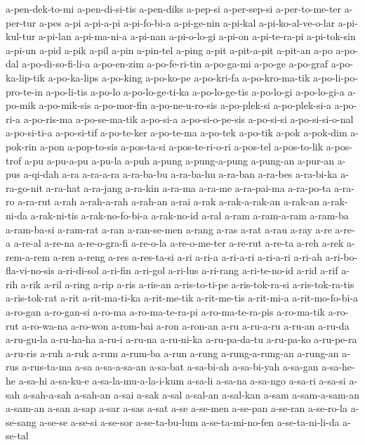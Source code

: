 {a-pen-dek-to-mi a-pen-di-si-tis a-pen-diks a-pep-si a-per-sep-si
a-per-to-me-ter a-per-tur a-pes a-pi a-pi-a-pi a-pi-fo-bi-a a-pi-ge-nin
a-pi-kal a-pi-ko-al-ve-o-lar a-pi-kul-tur a-pi-lan a-pi-ma-ni-a a-pi-nan
a-pi-o-lo-gi a-pi-on a-pi-te-ra-pi a-pi-tok-sin a-pi-un a-pid a-pik a-pil
a-pin a-pin-tel a-ping a-pit a-pit-a-pit a-pit-an a-po a-po-dal
a-po-di-so-fi-li-a a-po-en-zim a-po-fe-ri-tin a-po-ga-mi a-po-ge a-po-graf
a-po-ka-lip-tik a-po-ka-lips a-po-king a-po-ko-pe a-po-kri-fa
a-po-kro-ma-tik a-po-li-po-pro-te-in a-po-li-tis a-po-lo a-po-lo-ge-ti-ka
a-po-lo-ge-tis a-po-lo-gi a-po-lo-gi-a a-po-mik a-po-mik-sis a-po-mor-fin
a-po-ne-u-ro-sis a-po-plek-si a-po-plek-si-a a-po-ri-a a-po-ris-ma
a-po-se-ma-tik a-po-si-a a-po-si-o-pe-sis a-po-si-si a-po-si-si-o-nal
a-po-si-ti-a a-po-si-tif a-po-te-ker a-po-te-ma a-po-tek a-po-tik a-pok
a-pok-dim a-pok-rin a-pon a-pop-to-sis a-pos-ta-si a-pos-te-ri-o-ri
a-pos-tel a-pos-to-lik a-pos-trof a-pu a-pu-a-pu a-pu-la a-puh a-pung
a-pung-a-pung a-pung-an a-pur-an a-pus a-qi-dah a-ra a-ra-a-ra a-ra-ba-bu
a-ra-ba-hu a-ra-ban a-ra-bes a-ra-bi-ka a-ra-go-nit a-ra-hat a-ra-jang
a-ra-kin a-ra-ma a-ra-me a-ra-pai-ma a-ra-po-ta a-ra-ro a-ra-rut a-rah
a-rah-a-rah a-rah-an a-rai a-rak a-rak-a-rak-an a-rak-an a-rak-ni-da
a-rak-ni-tis a-rak-no-fo-bi-a a-rak-no-id a-ral a-ram a-ram-a-ram a-ram-ba
a-ram-ba-si a-ram-rat a-ran a-ran-se-men a-rang a-ras a-rat a-rau a-ray
a-re a-re-a a-re-al a-re-na a-re-o-gra-fi a-re-o-la a-re-o-me-ter a-re-rut
a-re-ta a-reh a-rek a-rem-a-rem a-ren a-reng a-res a-res-ta-si a-ri a-ri-a
a-ri-a-ri a-ri-a-ri a-ri-ah a-ri-bo-fla-vi-no-sis a-ri-di-sol a-ri-fin
a-ri-gol a-ri-lus a-ri-rang a-ri-te-no-id a-rid a-rif a-rih a-rik a-ril
a-ring a-rip a-ris a-ris-an a-ris-to-ti-pe a-ris-tok-ra-si
a-ris-tok-ra-tis a-ris-tok-rat a-rit a-rit-ma-ti-ka a-rit-me-tik
a-rit-me-tis a-rit-mi-a a-rit-mo-fo-bi-a a-ro-gan a-ro-gan-si a-ro-ma
a-ro-ma-te-ra-pi a-ro-ma-te-ra-pis a-ro-ma-tik a-ro-rut a-ro-wa-na
a-ro-won a-rom-bai a-ron a-ron-an a-ru a-ru-a-ru a-ru-an a-ru-da
a-ru-gu-la a-ru-ha-ha a-ru-i a-ru-na a-ru-ni-ka a-ru-pa-da-tu a-ru-pa-ko
a-ru-pe-ra a-ru-ris a-ruh a-ruk a-rum a-rum-ba a-run a-rung
a-rung-a-rung-an a-rung-an a-rus a-rus-ta-ma a-sa a-sa-a-sa-an a-sa-bat
a-sa-bi-ah a-sa-bi-yah a-sa-gan a-sa-he-he a-sa-hi a-sa-ku-e
a-sa-la-mu-a-la-i-kum a-sa-li a-sa-na a-sa-ngo a-sa-ri a-sa-si a-sah
a-sah-a-sah a-sah-an a-sai a-sak a-sal a-sal-an a-sal-kan a-sam
a-sam-a-sam-an a-sam-an a-san a-sap a-sar a-sas a-sat a-se a-se-men
a-se-pan a-se-ran a-se-ro-la a-se-sang a-se-se a-se-si a-se-sor
a-se-ta-bu-lum a-se-ta-mi-no-fen a-se-ta-ni-li-da a-se-tal
}
